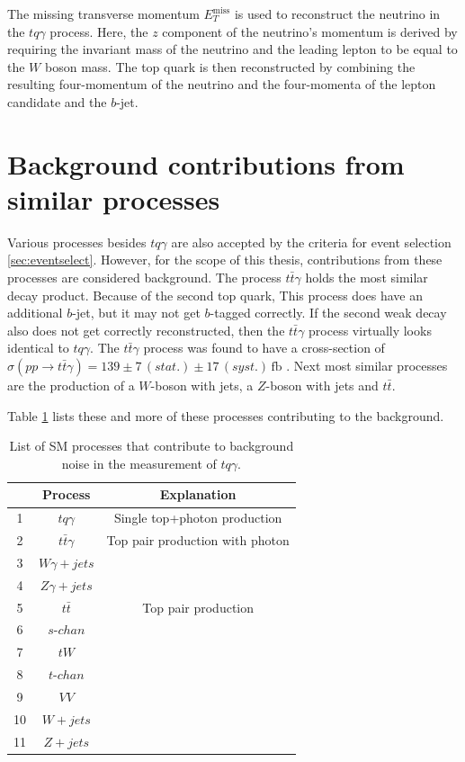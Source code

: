 The missing transverse momentum $E_T^{\text{miss}}$ is used to reconstruct the neutrino in the $tq\gamma$ process. Here, the $z$ component of the neutrino's momentum is derived by requiring the invariant mass of the neutrino and the leading lepton to be equal to the $W$ boson mass.
The top quark is then reconstructed by combining the resulting four-momentum of the neutrino and the four-momenta of the lepton candidate and the $b$-jet.  
\section{Background contributions from similar processes}



Various processes besides $tq\gamma$ are also accepted by the criteria for event selection \ref{sec:eventselect}. However, for the scope of this thesis, contributions from these processes are considered background.  
The process $t\bar{t}\gamma$ holds the most similar decay product. Because of the second top quark, This process does have an additional $b$-jet, but it may not get $b$-tagged correctly. If the second weak decay also does not get correctly reconstructed, then the $t\bar{t}\gamma$ process virtually looks identical to $tq\gamma$. 
The $t\bar{t}\gamma$ process was found to have a cross-section of $\sigma(pp \rightarrow t\bar{t}\gamma) = 139 \pm 7 \,(stat.) \pm 17 \,(syst.) \,\si{\femto\barn}$ \cite{ttgamma}. 
Next most similar processes are the production of a $W$-boson with jets, a $Z$-boson with jets and $t\bar{t}$.

Table \ref{tab:background} lists these and more of these processes contributing to the background.
\begin{table}
    \centering
    \begin{tabular}{c c c}
        \toprule
        {} & Process & Explanation\\
        \midrule
        1 & $tq\gamma$&         Single top+photon production\\[.1cm]
        2 & $t\bar{t}\gamma$&   Top pair production with photon\\[.1cm]
        3 & $W\gamma + jets$&   \\[.1cm]
        4 & $Z\gamma + jets$&   \\[.1cm]
        5 & $t\bar{t}$&         Top pair production\\[.1cm]
        6 & $s\text{-}chan$&    \\[.1cm]
        7 & $t W$&              \\[.1cm]
        8 & $t\text{-}chan$&    \\[.1cm]
        9 & $VV$&               \\[.1cm]
        10& $W+jets$&           \\[.1cm]
        11& $Z+jets$&           \\[.1cm]
        \bottomrule
    \end{tabular}
    \caption{List of SM processes that contribute to background noise in the measurement of $tq\gamma$.}
    \label{tab:background}
\end{table}





